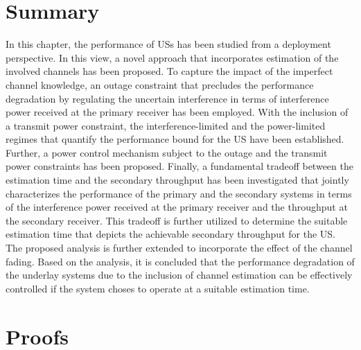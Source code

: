 {\section{Summary} \label{sec:conc}
In this chapter, the performance of USs has been studied from a deployment perspective. In this view, a novel approach that incorporates estimation of the involved channels has been proposed. To capture the impact of the imperfect channel knowledge, an outage constraint that precludes the performance degradation by regulating the uncertain interference in terms of interference power received at the primary receiver has been employed. With the inclusion of a transmit power constraint, the interference-limited and the power-limited regimes that quantify the performance bound for the US have been established. Further, a power control mechanism subject to the outage and the transmit power constraints has been proposed. Finally, a fundamental tradeoff between the estimation time and the secondary throughput has been investigated that jointly characterizes the performance of the primary and the secondary systems in terms of the interference power received at the primary receiver and the throughput at the secondary receiver. This tradeoff is further utilized to determine the suitable estimation time that depicts the achievable secondary throughput for the US. The proposed analysis is further extended to incorporate the effect of the channel fading. Based on the analysis, it is concluded that the performance degradation of the underlay systems due to the inclusion of channel estimation can be effectively controlled if the system choses to operate at a suitable estimation time. %

\section{Proofs}
}
